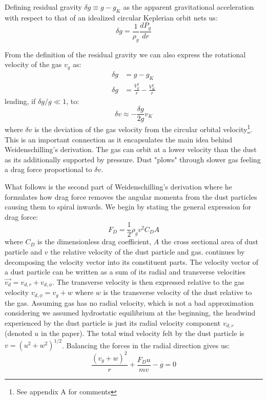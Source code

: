 \documentclass[12pt]{article}
\begin{document}
Defining residual gravity $\delta g \equiv g-g_K$ as the apparent gravitational acceleration with respect to that of an idealized circular Keplerian orbit nets us:
\begin{equation}
    \delta g = \frac{1}{\rho_g}\frac{dP_g}{dr}
\end{equation}

From the definition of the residual gravity we can also express the rotational velocity of the gas $v_g$ as:
\begin{align}
    \delta g &= g - g_K \\
    \delta g &= \frac{V^2_g}{r} - \frac{V^2_K}{r}
\end{align}
leading, if $\delta g / g \ll 1$, to:
\begin{equation}
    \label{eq:dvdg}
    \delta v \approx - \frac{\delta g}{2 g}v_K
\end{equation}
where $\delta v$ is the deviation of the gas velocity from the circular orbital velocity\footnote{See appendix A for comments}. This is an important connection as it encapsulates the main idea behind Weidenschilling's derivation. The gas can orbit at a lower velocity than the dust as its additionally supported by pressure. Dust "plows" through slower gas feeling a drag force proportional to $\delta v$. 

What follows is the second part of Weidenschilling's derivation where he formulates how drag force removes the angular momenta from the dust particles causing them to spiral inwards. We begin by stating the general expression for drag force: 
\begin{equation}
    F_D = \frac{1}{2} \rho_g v^2 C_D A  
\end{equation}
where $C_D$ is the dimensionless drag coefficient, $A$ the cross sectional area of dust particle and $v$ the relative velocity of the dust particle and gas. \citet{Weidenschilling77} continues  by decomposing the velocity vector into its constituent parts. The velocity vector of a dust particle can be written as a sum of its radial and transverse velocities $\vec{v_d} = v_{d, r} + v_{d, \phi}$. The transverse velocity is then expressed relative to the gas velocity $v_{d, \phi} = v_g + w$ where $w$ is the transverse velocity of the dust relative to the gas. Assuming gas has no radial velocity, which is not a bad approximation considering we assumed hydrostatic equilibrium at the beginning, the headwind experienced by the dust particle is just its radial velocity component $v_{d, r}$ (denoted $u$ in the paper). The total wind velocity felt by the dust particle is $v= (u^2+w^2)^{1/2}$. Balancing the forces in the radial direction gives us:
\begin{equation}
    \label{eq:forceeq1}
    \frac{(v_g + w)^2}{r} + \frac{F_D u}{mv} - g = 0
\end{equation}
\end{document}
